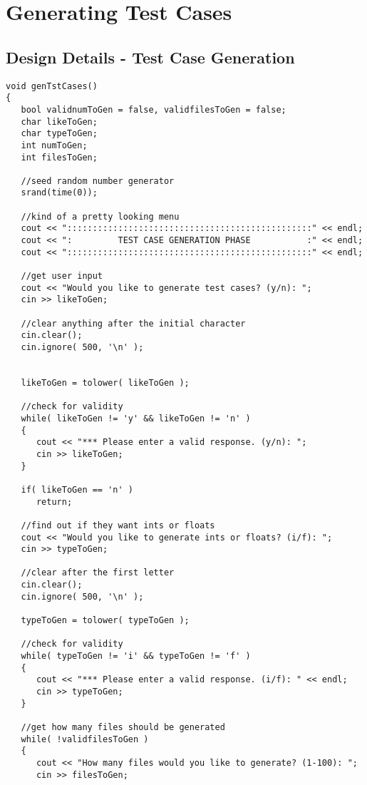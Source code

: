 \section{Generating Test Cases}

\subsection{Design Details - Test Case Generation}

\begin{lstlisting}
void genTstCases()
{
   bool validnumToGen = false, validfilesToGen = false;
   char likeToGen;
   char typeToGen;
   int numToGen;
   int filesToGen;
   
   //seed random number generator
   srand(time(0));
   
   //kind of a pretty looking menu
   cout << "::::::::::::::::::::::::::::::::::::::::::::::::" << endl;
   cout << ":         TEST CASE GENERATION PHASE           :" << endl;
   cout << "::::::::::::::::::::::::::::::::::::::::::::::::" << endl;
   
   //get user input
   cout << "Would you like to generate test cases? (y/n): ";
   cin >> likeToGen;
   
   //clear anything after the initial character
   cin.clear();
   cin.ignore( 500, '\n' );
   
   
   likeToGen = tolower( likeToGen );
   
   //check for validity
   while( likeToGen != 'y' && likeToGen != 'n' )
   {
      cout << "*** Please enter a valid response. (y/n): ";
      cin >> likeToGen;
   }

   if( likeToGen == 'n' )
      return;   
         
   //find out if they want ints or floats   
   cout << "Would you like to generate ints or floats? (i/f): ";
   cin >> typeToGen;
   
   //clear after the first letter
   cin.clear();
   cin.ignore( 500, '\n' );
   
   typeToGen = tolower( typeToGen );
   
   //check for validity
   while( typeToGen != 'i' && typeToGen != 'f' )
   {
      cout << "*** Please enter a valid response. (i/f): " << endl;
      cin >> typeToGen;
   }

   //get how many files should be generated     
   while( !validfilesToGen )
   {
      cout << "How many files would you like to generate? (1-100): ";
      cin >> filesToGen;
      

\end{lstlisting}
